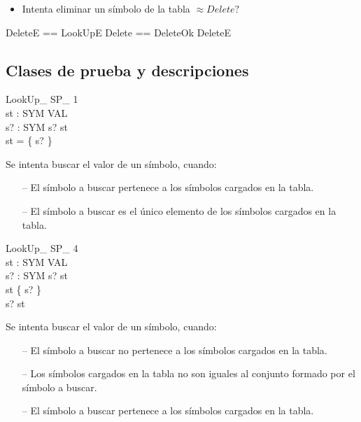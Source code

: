 \begin{itemize}
  \item Intenta eliminar un símbolo de la tabla $\approx Delete?$ 
\end{itemize}

\begin{zed}
DeleteE == LookUpE \also
Delete == DeleteOk \lor DeleteE
\end{zed}

\subsection*{Clases de prueba y descripciones}

\begin{schema}{LookUp\_ SP\_ 1}\\
 st : SYM \pfun VAL \\
 s? : SYM 
\where
 s? \in \dom st \\
 \dom st = \{ s? \}
\end{schema}

\begin{tcolorbox}[colback=gray!5!white,colframe=gray!50!black,
  colbacktitle=gray!75!black,title=LookUp\_ SP\_ 1]
  Se intenta buscar el valor de un símbolo, cuando:
     \begin{itemize}
        \item[--]{El símbolo a buscar pertenece a los símbolos cargados en la tabla.}
        \item[--]{El símbolo a buscar es el único elemento de los símbolos cargados en la tabla.}
     \end{itemize}
\end{tcolorbox}

\begin{schema}{LookUp\_ SP\_ 4}\\
 st : SYM \pfun VAL \\
 s? : SYM 
\where
 s? \notin \dom st \\
 \dom st \neq \{ s? \} \\
 s? \in \dom st
\end{schema}

\begin{tcolorbox}[colback=gray!5!white,colframe=gray!50!black,
  colbacktitle=gray!75!black,title=LookUp\_ SP\_ 4]
  Se intenta buscar el valor de un símbolo, cuando:
     \begin{itemize}
        \item[--]{El símbolo a buscar no pertenece a los símbolos cargados en la tabla.}
        \item[--]{Los símbolos cargados en la tabla no son iguales al conjunto formado por el símbolo a buscar.}
        \item[--]{El símbolo a buscar pertenece a los símbolos cargados en la tabla.}
     \end{itemize}
\end{tcolorbox}

